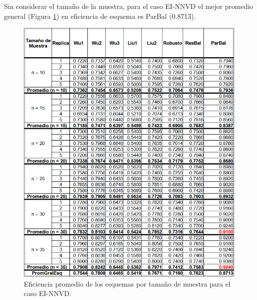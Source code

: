 Sin considerar el tamaño de la muestra, para el caso EI-NNVD el mejor promedio general (Figura \ref{fig:EficPromEsqTamMuesEsqRemuEI-NNVD}) en eficiencia de esquema es ParBal (0.8713).


\begin{figure}[ht] 
	\centering 
	\includegraphics[width=0.70\linewidth]{img/EI_NNVD_Efic_Esq.png} 
	\caption{Eficiencia promedio de los esquemas por tamaño de muestra para el caso EI-NNVD.} 
	\label{fig:EficPromEsqTamMuesEsqRemuEI-NNVD}
\end{figure}
\FloatBarrier

\clearpage
